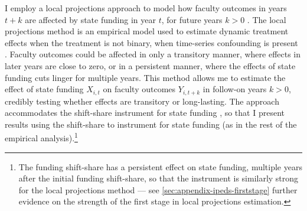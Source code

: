 I employ a local projections approach to model how faculty outcomes in years $t+k$ are affected by state funding in year $t$, for future years $k > 0$ \citep{jorda2005}.
The local projections method is an empirical model used to estimate dynamic treatment effects when the treatment is not binary, when time-series confounding is present \citep{montiel2021local}.
Faculty outcomes could be affected in only a transitory manner, where effects in later years are close to zero, or in a persistent manner, where the effects of state funding cuts linger for multiple years.
This method allows me to estimate the effect of state funding $X_{i,t}$ on faculty outcomes $Y_{i, t+ k}$ in follow-on years $k > 0$, credibly testing whether effects are transitory or long-lasting.
The approach accommodates the shift-share instrument for state funding \citep{olea2021inference}, so that I present results using the shift-share to instrument for state funding (as in the rest of the empirical analysis).\footnote{
    The funding shift-share has a persistent effect on state funding, multiple years after the initial funding shift-share, so that the instrument is similarly strong for the local projections method --- see \autoref{sec:appendix-ipeds-firststage} further evidence on the strength of the first stage in local projections estimation.
}
